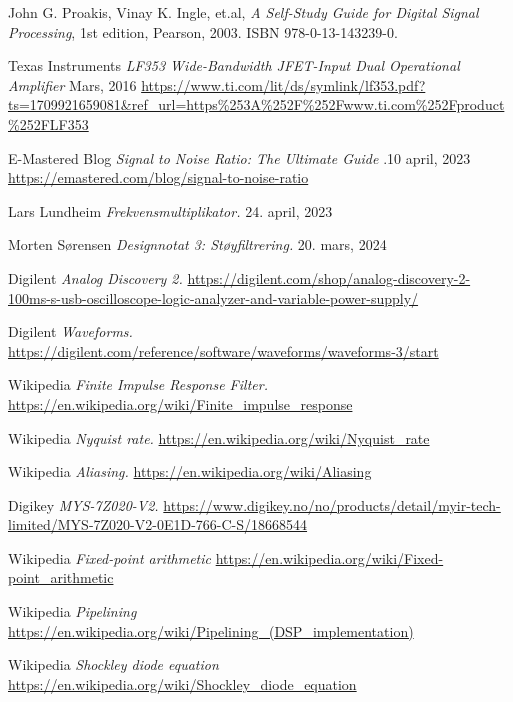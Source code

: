     John G. Proakis, Vinay K. Ingle, et.al,
    \emph{A Self-Study Guide for Digital Signal Processing},
    1st edition,
    Pearson,
    2003.
    ISBN 978-0-13-143239-0.

    Texas Instruments
    \emph{LF353 Wide-Bandwidth JFET-Input Dual Operational Amplifier}
    Mars, 2016
    \url{https://www.ti.com/lit/ds/symlink/lf353.pdf?ts=1709921659081&ref_url=https\%253A\%252F\%252Fwww.ti.com\%252Fproduct\%252FLF353}

    E-Mastered Blog
    \emph{ Signal to Noise Ratio: The Ultimate Guide}
    .10 april, 2023
    \url{https://emastered.com/blog/signal-to-noise-ratio}

    Lars Lundheim
    \emph{Frekvensmultiplikator.}
    24. april, 2023

    Morten Sørensen
    \emph{Designnotat 3: Støyfiltrering.}
    20. mars, 2024

    Digilent
    \emph{Analog Discovery 2.}
    \newline
    \url{https://digilent.com/shop/analog-discovery-2-100ms-s-usb-oscilloscope-logic-analyzer-and-variable-power-supply/}
    
    Digilent
    \emph{Waveforms.}
    \newline
    \url{https://digilent.com/reference/software/waveforms/waveforms-3/start}

    Wikipedia
    \emph{Finite Impulse Response Filter.}
    \url{https://en.wikipedia.org/wiki/Finite_impulse_response}

    Wikipedia
    \emph{Nyquist rate.}
    \url{https://en.wikipedia.org/wiki/Nyquist_rate}

    Wikipedia
    \emph{Aliasing.}
    \url{https://en.wikipedia.org/wiki/Aliasing}

    Digikey
    \emph{MYS-7Z020-V2.}
    \url{https://www.digikey.no/no/products/detail/myir-tech-limited/MYS-7Z020-V2-0E1D-766-C-S/18668544}

    Wikipedia
    \emph{Fixed-point arithmetic}
    \url{https://en.wikipedia.org/wiki/Fixed-point_arithmetic}

    Wikipedia
    \emph{Pipelining}
    \url{https://en.wikipedia.org/wiki/Pipelining_(DSP_implementation)}

    Wikipedia
    \emph{Shockley diode equation}
    \url{https://en.wikipedia.org/wiki/Shockley_diode_equation}
